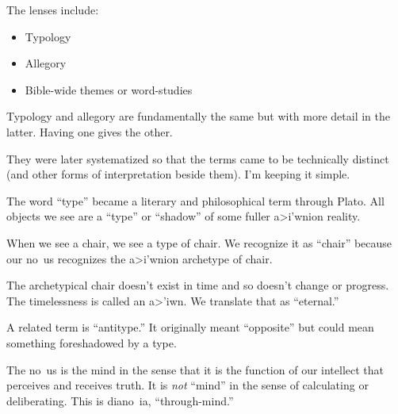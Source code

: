 \documentclass{beamer}
\begin{document}
\begin{frame}
  The lenses include:\pause
  \begin{itemize}
	\item Typology\pause
	\item Allegory\pause
	\item Bible-wide themes or word-studies
  \end{itemize}
\end{frame}

\begin{frame}
  Typology and allegory are fundamentally the same but with more detail in the latter.
  Having one gives the other.
\end{frame}

\begin{frame}
  They were later systematized so that the terms came to be technically distinct (and other forms of interpretation beside them).
  I'm keeping it simple.
\end{frame}

\begin{frame}
  The word ``type'' became a literary and philosophical term through Plato.
  All objects we see are a ``type'' or ``shadow'' of some fuller \textgreek{a>i'wnion} reality.
\end{frame}

\begin{frame}
  When we see a chair, we see a type of chair.
  We recognize it as ``chair'' because our \textgreek{no~us} recognizes the \textgreek{a>i'wnion} archetype of chair.
\end{frame}

\begin{frame}
  The archetypical chair doesn't exist in time and so doesn't change or progress.
  The timelessness is called an \textgreek{a>'iwn}.
  We translate that as ``eternal.''
\end{frame}

\begin{frame}
  A related term is ``antitype.''
  It originally meant ``opposite'' but could mean something foreshadowed by a type.
\end{frame}

\begin{frame}
  The
  no~us
  is the mind in the sense that it is the function of our intellect that perceives and receives truth.
  It is \emph{not} ``mind'' in the sense of calculating or deliberating.
  This is \textgreek{diano~ia}, ``through-mind.''
\end{frame}
\end{document}
